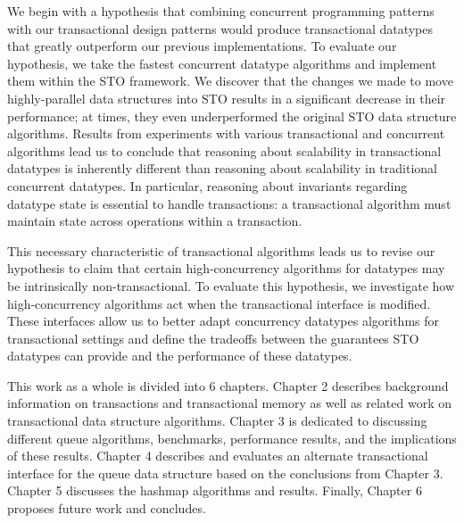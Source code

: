 We begin with a hypothesis that combining concurrent programming patterns with our transactional design patterns would produce transactional datatypes that greatly outperform our previous implementations. To evaluate our hypothesis, we take the fastest concurrent datatype algorithms and implement them within the STO framework. We discover that the changes we made to move highly-parallel data structures into STO results in a significant decrease in their performance; at times, they even underperformed the original STO data structure algorithms. Results from experiments with various transactional and concurrent algorithms lead us to conclude that reasoning about scalability in transactional datatypes is inherently different than reasoning about scalability in traditional concurrent datatypes. In particular, reasoning about invariants regarding datatype state is essential to handle transactions: a transactional algorithm must maintain state across operations within a transaction. 

This necessary characteristic of transactional algorithms leads us to revise our hypothesis to claim that certain high-concurrency algorithms for datatypes may be intrinsically non-transactional. To evaluate this hypothesis, we investigate how high-concurrency algorithms act when the transactional interface is modified. These interfaces allow us to better adapt concurrency datatypes algorithms for transactional settings and define the tradeoffs between the guarantees STO datatypes can provide and the performance of these datatypes.

This work as a whole is divided into 6 chapters. Chapter 2 describes background information on transactions and transactional memory as well as related work on transactional data structure algorithms. Chapter 3 is dedicated to discussing different queue algorithms, benchmarks, performance results, and the implications of these results. Chapter 4 describes and evaluates an alternate transactional interface for the queue data structure based on the conclusions from Chapter 3. Chapter 5 discusses the hashmap algorithms and results. Finally, Chapter 6 proposes future work and concludes.
